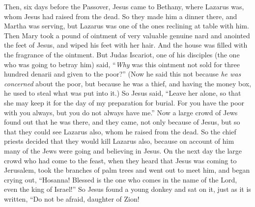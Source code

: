 \begin{biblechapter} %
 Then, six days before the Passover, Jesus came to Bethany, where Lazarus was, whom Jesus had raised from the dead.
\verse So they made him a dinner there, and Martha was serving, but Lazarus was one of the ones reclining at table with him.
\verse Then Mary took a pound of ointment of very valuable genuine nard and anointed the feet of Jesus, and wiped his feet with her hair. And the house was filled with the fragrance of the ointment.
\verse But Judas Iscariot, one of his disciples (the one who was going to betray him) said,
\verse “\textit{Why} was this ointment not sold for three hundred denarii and given to the poor?”
\verse (Now he said this not because \textit{he was concerned} about the poor, but because he was a thief, and having the money box, he used to steal what was put into it.)
\verse So Jesus said, “Leave her alone, so that she may keep it for the day of my preparation for burial.
\verse For you have the poor with you always, but you do not always have me.”
 Now a large crowd of Jews found out that he was there, and they came, not only because of Jesus, but so that they could see Lazarus also, whom he raised from the dead.
\verse So the chief priests decided that they would kill Lazarus also,
\verse because on account of him many of the Jews were going and believing in Jesus.
 On the next day the large crowd who had come to the feast, when they heard that Jesus was coming to Jerusalem,
\verse took the branches of palm trees and went out to meet him, and began crying out, “Hosanna! 
Blessed is the one who comes in the name of the Lord, 
even the king of Israel!”
\verse So Jesus found a young donkey and sat on it, just as it is written,
\verse “Do not be afraid, daughter of Zion! 

\end{biblechapter}
